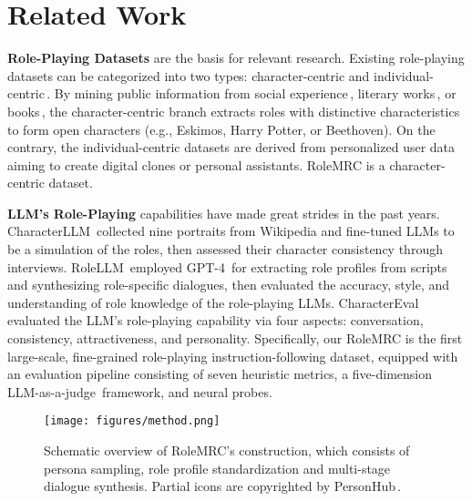 \section{Related Work}
\label{sec:literature}

\noindent \textbf{Role-Playing Datasets} are the basis for relevant research. Existing role-playing datasets can be categorized into two types: character-centric and individual-centric\,\cite{chen2024persona}. By mining public information from social experience\,\cite{shao2023character,shen2023roleeval,lu-etal-2024-large,dai2024mmrole}, literary works\,\cite{li2023chatharuhi}, or books\,\cite{zhou2023characterglm,chen2024roleinteract,chen-etal-2023-large}, the character-centric branch extracts roles with distinctive characteristics to form open characters (e.g., Eskimos, Harry Potter, or Beethoven). On the contrary, the individual-centric datasets are derived from personalized user data\,\cite{li2021dialogue,ahn-etal-2023-mpchat,agrawal-etal-2023-multimodal,gao-etal-2023-livechat} aiming to create digital clones or personal assistants. RoleMRC is a character-centric dataset.

\noindent \textbf{LLM's Role-Playing} capabilities have made great strides in the past years. CharacterLLM\,\cite{shao2023character} collected nine portraits from Wikipedia and fine-tuned LLMs to be a simulation of the roles, then assessed their character consistency through interviews. RoleLLM\,\cite{wang2023rolellm} employed GPT-4\,\cite{openai2023gpt4} for extracting role profiles from scripts and synthesizing role-specific dialogues, then evaluated the accuracy, style, and understanding of role knowledge of the role-playing LLMs. CharacterEval\,\cite{tu2024charactereval} evaluated the LLM's role-playing capability via four aspects: conversation, consistency, attractiveness, and personality. Specifically, our RoleMRC is the first large-scale, fine-grained role-playing instruction-following dataset, equipped with an evaluation pipeline consisting of seven heuristic metrics, a five-dimension LLM-as-a-judge\,\cite{zheng2024judging} framework, and neural probes.

\begin{figure*}[t]
    \centering
    \texttt{[image: figures/method.png]}
    \vspace{-6mm}
    \caption{Schematic overview of RoleMRC's construction, which consists of persona sampling, role profile standardization and multi-stage dialogue synthesis. Partial icons are copyrighted by PersonHub\,\cite{ge2024scaling}.}
    \label{fig:method}
    \vspace{-3mm}
\end{figure*}
